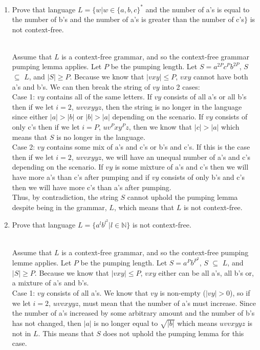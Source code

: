 \documentclass[11pt]{article}
\theoremstyle{definition}
\theoremstyle{theorem}
\newcommand{\solution}{\medskip\noindent{\color{blue}\textbf{Solution:}}}
\begin{document}
\begin{enumerate}[label=(\alph*)]

\item Prove that language $L = \{w | w \in \{a,b,c\}^*$ and the number of a's is equal to the number of b's and the number of a's is greater than the number of c's$\}$ is not context-free.

\solution \\
Assume that $L$ is a context-free grammar, and so the context-free grammar pumping lemma applies. Let $P$ be the pumping length. Let $S = a^{2P}c^{P}b^{2P}$,  $S$ $\subseteq$ $L$, and $|S| \geq P$. Because we know that $|vxy| \leq P$, $vxy$ cannot have both a's and b's. We can then break the string of $vy$ into 2 cases: \\

Case 1: $vy$ contains all of the same letters. If $vy$ consists of all a's or all b's then if we let $i = 2$, $uvvxyyz$, then the string is no longer in the language since either $|a| > |b|$ or $|b| > |a|$ depending on the scenario. If $vy$ consists of only c's then if we let $i = P$, $uv^Pxy^Pz$, then we know that $|c| > |a|$ which means that $S$ is no longer in the language. \\ 

Case 2: $vy$ contains some mix of a's and c's or b's and c's. If this is the case then if we let $i = 2$, $uvvxyyz$, we will have an unequal number of a's and c's depending on the scenario. If $vy$ is some mixture of a's and c's then we will have more a's than c's after pumping and if $vy$ consists of only b's and c's then we will have more c's than a's after pumping. \\

Thus, by contradiction, the string $S$ cannot uphold the pumping lemma despite being in the grammar, $L$, which means that $L$ is not context-free.
\item Prove that language $L = \{a^l b^{l^2} | l \in \mathbb{N}\}$ is not context-free.

\solution \\
Assume that $L$ is a context-free grammar, and so the context-free pumping lemme applies. Let $P$ be the pumping length. Let $S = a^Pb^{P^2}$, $S$ $\subseteq$ $L$, and $|S| \geq P$. Because we know that $|vxy| \leq P$, $vxy$ either can be all a's, all b's or, a mixture of a's and b's. \\

Case 1: $vy$ consists of all a's. We know that $vy$ is non-empty ($|vy| > 0$), so if we let $i = 2$, $uvvxyyz$, must mean that the number of a's must increase. Since the number of a's increased by some arbitrary amount and the number of b's has not changed, then $|a|$ is no longer equal to $\sqrt{|b|}$ which means $uvvxyyz$ is not in $L$. This means that $S$ does not uphold the pumping lemma for this case. \\


\end{enumerate}
\end{document}
